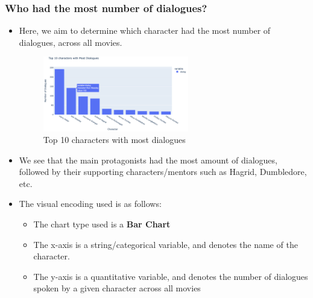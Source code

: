 \documentclass[a4paper]{article}
\begin{document}
\subsubsection{Who had the most number of dialogues?}
\begin{itemize}
    \item Here, we aim to determine which character had the most number of dialogues, across all movies.
    \begin{figure}[H]
        \centering
        \includegraphics[width=0.6\textwidth]{dialog}
        \caption{Top 10 characters with most dialogues}
        \label{fig:dialog}
    \end{figure}
    \item We see that the main protagonists had the most amount of dialogues, followed by their supporting characters/mentors such as Hagrid, Dumbledore, etc.
    \item The visual encoding used is as follows:
    \begin{itemize}
        \item The chart type used is a \textbf{Bar Chart}  
        \item The x-axis is a string/categorical variable, and denotes the name of the character.
        \item The y-axis is a quantitative variable, and denotes the number of dialogues spoken by a given character across all movies
    \end{itemize}
\end{itemize}
\end{document}
